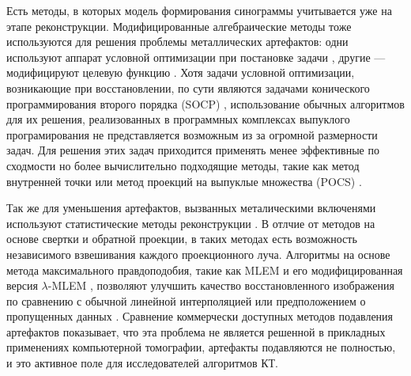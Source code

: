 Есть методы, в которых модель формирования синограммы учитывается уже на этапе реконструкции.
Модифицированные алгебраические методы тоже используются для решения проблемы металлических артефактов: одни используют аппарат условной оптимизации при постановке задачи \cite{zhang2011metal, sidky2008image}, другие --- модифицируют целевую функцию \cite{meyer2010normalized, kotsenas2015ct}.
Хотя задачи условной оптимизации, возникающие при восстановлении, по сути являются задачами конического программирования второго порядка (SOCP) \cite{boyd2004convex, nesterov2009primal}, использование обычных алгоритмов для их решения, реализованных в программных комплексах выпуклого програмирования \cite{andersen2013cvxopt, mosek2010mosek} не представляется возможным из за огромной размерности задач.
Для решения этих задач приходится применять менее эффективные по сходмости но более вычислительно подходящие методы, такие как метод внутренней точки \cite{kim2007interior} или метод проекций на выпуклые множества (POCS) \cite{sidky2008image}.

Так же для уменьшения артефактов, вызванных металическими включенями используют статистические методы реконструкции \cite{jmuller2006, buzug2008computed}.
В отлчие от методов на основе свертки и обратной проекции, в таких методах есть возможность независимого взвешивания каждого проекционного луча.
Алгоритмы на основе метода максимального правдоподобия, такие как MLEM \cite{buzug2008computed, wang1996iterative} и его модифицированная версия $\lambda$-MLEM \cite{oehler2007statistical}, позволяют улучшить качество восстановленного изображения по сравнению с обычной линейной интерполяцией или предположением о пропущенных данных \cite{amirkhanov2012evaluation}.
Сравнение коммерчески доступных методов подавления артефактов \cite{huang2015evaluation} показывает, что эта проблема не является решенной в прикладных применениях компьютерной томографии, артефакты подавляются не полностью, и это активное поле для исследователей алгоритмов КТ.

\begin{comment}

\todo{введение - обзор из статьи аит2013 и бакалаврского диплома}

 Предлагаются новые версии алгоритмов, основанных на алгебраическом подходе, способных работать с сильно зашумлёнными проекциями. Такое условие сформировано необходимостью сокращать время регистрации проекций. Для некоторых применений уменьшение времени регистрации связано с требованием сокращения дозы облучения, для других --- обусловлено высокой динамикой поведения исследуемого объекта. Также следует отметить, что алгебраические методы реконструкции незаменимы, когда речь идет об экспериментах с малым числом проекционных углов и измерениях в ограниченном телесном угле. Только алгебраические методы применимы для решения задач трансмиссионно-эмиссионной томографии, если ослаблением зондирующего и вторичного излучений пренебречь нельзя.




\end{comment}

